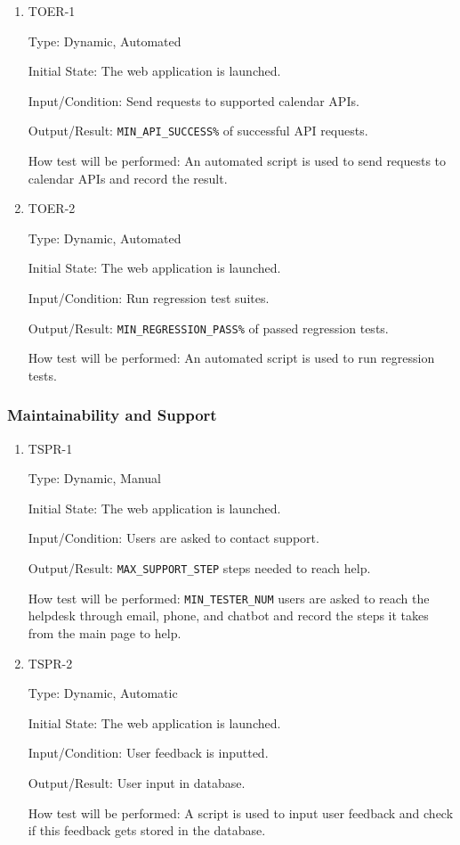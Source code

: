 \documentclass[12pt, titlepage]{article}
\begin{document}
\begin{enumerate}
\item{TOER-1\\}\label{TOER-1}

Type: Dynamic, Automated
					
Initial State: The web application is launched.
					
Input/Condition: Send requests to supported calendar APIs.
					
Output/Result: \texttt{MIN\_API\_SUCCESS\%} of successful API requests.
					
How test will be performed: An automated script is used to send requests to calendar APIs and record the result.


\item{TOER-2\\}\label{TOER-2}

Type: Dynamic, Automated
					
Initial State: The web application is launched.
					
Input/Condition: Run regression test suites.
					
Output/Result: \texttt{MIN\_REGRESSION\_PASS\%} of passed regression tests.
					
How test will be performed: An automated script is used to run regression tests.

\end{enumerate}
\subsubsection{Maintainability and Support}

\begin{enumerate}
\item{TSPR-1\\}\label{TSPR-1}

Type: Dynamic, Manual
					
Initial State: The web application is launched.
					
Input/Condition: Users are asked to contact support.
					
Output/Result: \texttt{MAX\_SUPPORT\_STEP} steps needed to reach help.
					
How test will be performed: \texttt{MIN\_TESTER\_NUM} users are asked to reach the helpdesk through email, phone, and chatbot and record the steps it takes from the main page to help.


\item{TSPR-2\\}\label{TSPR-2}

Type: Dynamic, Automatic
					
Initial State: The web application is launched.
					
Input/Condition: User feedback is inputted.
					
Output/Result: User input in database.
					
How test will be performed: A script is used to input user feedback and check if this feedback gets stored in the database.

\end{enumerate}
\end{document}
